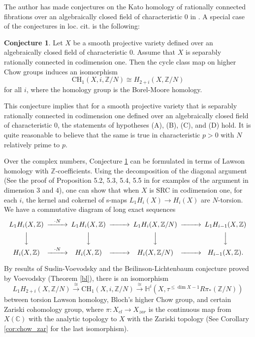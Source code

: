 \documentclass{amsart}
\theoremstyle{definition}
\newtheorem{conj}[theorem]{Conjecture}
\theoremstyle{remark}
\newcommand{\mbb}{\mathbb}
\newcommand{\ZZ}{\mbb{Z}}
\newcommand{\CC}{\mbb{C}}
\begin{document}
The author has made conjectures on the Kato homology of rationally connected fibrations over an algebraically closed field of characteristic $0$ in \cite[Conjecture 1.16]{zerocycleLaurent}. A special case of the conjectures in loc. cit. is the following:
\begin{conj}\label{conj:tian}
    Let $X$ be a smooth projective variety defined over an algebraically closed field of characteristic $0$. Assume that $X$ is separably rationally connected in codimension one. Then the cycle class map on higher Chow groups induces an isomorphism
    \[
    \text{CH}_1(X, i, \ZZ/N) \cong H_{2+i}(X, \ZZ/N)
    \]
    for all $i$, where the homology group is the Borel-Moore homology.
\end{conj}
This conjecture implies that for a smooth projective variety that is separably rationally connected in codimension one defined over an algebraically closed field of characteristic $0$, the statements of hypotheses (A), (B), (C), and (D) hold. It is quite reasonable to believe that the same is true in characteristic $p>0$ with $N$ relatively prime to $p$.


Over the complex numbers, Conjecture \ref{conj:tian} can be formulated in terms of Lawson homology with $\ZZ$-coefficients. Using the decomposition of the diagonal argument (See the proof of Proposition 5.2, 5.3, 5.4, 5.5 in \cite{sstK3fold} for examples of the argument in dimension $3$ and $4$), one can show that when $X$ is SRC in codimension one, for each $i$, the kernel and cokernel of s-maps $L_1H_i(X) \to H_i(X)$ are $N$-torsion.
We have a commutative diagram of long exact sequences
\[
\begin{CD}
L_1H_i(X, \ZZ) @>\cdot N>>L_1H_i(X, \ZZ) @>>>L_1H_i(X, \ZZ/N)  @>>>L_1H_{i-1}(X, \ZZ)\\
@VVV @VVV @VVV @VVV\\
H_{i}(X, \ZZ) @>\cdot N>> H_{i}(X, \ZZ) @>>> H_{i}(X, \ZZ/N) @>>>H_{i-1}(X, \ZZ).\\
\end{CD}
\]


By results of Suslin-Voevodsky \cite[Theorem 9.1]{Suslin_Voevodsky_homology} and the Beilinson-Lichtenbaum conjecture proved by Voevodsky (Theorem \ref{bl}),
there is an isomorphism 
\[
L_1H_{2+i}(X, \ZZ/N) \xrightarrow{\cong} \text{CH}_1(X, i, \ZZ/N) \xrightarrow{\cong} \mathbb{H}^i(X, \tau^{\leq \dim X-1 }R\pi_*(\ZZ/N))
\] 
between torsion Lawson homology, Bloch's higher Chow group,  and certain Zariski cohomology group, where $\pi: X_{cl} \to X_{zar}$ is the continuous map from $X(\CC)$ with the analytic topology to $X$ with the Zariski topology (See Corollary \ref{cor:chow_zar} for the last isomorphism).
\end{document}
